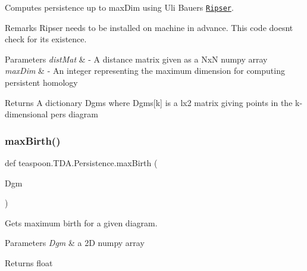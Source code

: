 Computes persistence up to max\+Dim using Uli Bauer\textquotesingle{}s \href{https://github.com/Ripser/ripser}{\tt Ripser}.

\begin{DoxyRemark}{Remarks}
Ripser needs to be installed on machine in advance. This code doesn\textquotesingle{}t check for it\textquotesingle{}s existence.
\end{DoxyRemark}

\begin{DoxyParams}{Parameters}
{\em dist\+Mat} & -\/ A distance matrix given as a NxN numpy array \\
\hline
{\em max\+Dim} & -\/ An integer representing the maximum dimension for computing persistent homology\\
\hline
\end{DoxyParams}
\begin{DoxyReturn}{Returns}
A dictionary Dgms where Dgms\mbox{[}k\mbox{]} is a lx2 matrix giving points in the k-\/dimensional pers diagram
\end{DoxyReturn}
\mbox{\label{namespaceteaspoon_1_1_t_d_a_1_1_persistence_aa91a12cbd748fc2f13944fbc653739d1}}
\subsubsection{\texorpdfstring{max\+Birth()}{maxBirth()}}
{\footnotesize\ttfamily def teaspoon.\+T\+D\+A.\+Persistence.\+max\+Birth (\begin{DoxyParamCaption}\item[{}]{Dgm }\end{DoxyParamCaption})}



Gets maximum birth for a given diagram.


\begin{DoxyParams}{Parameters}
{\em Dgm} & a 2D numpy array\\
\hline
\end{DoxyParams}
\begin{DoxyReturn}{Returns}
float
\end{DoxyReturn}
\mbox{\label{namespaceteaspoon_1_1_t_d_a_1_1_persistence_a866a47a538d7042da1de685bed83d00e}}
